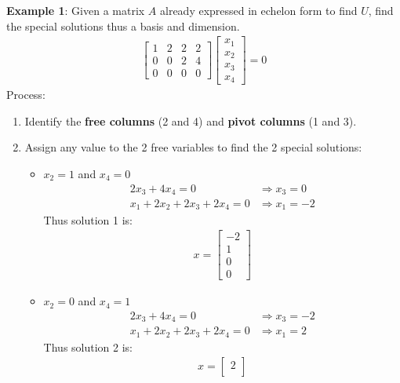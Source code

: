\documentclass[10pt,a4paper]{article}
\begin{document}
\textbf{Example 1}: Given a matrix $A$ already expressed in echelon form to find $U$, find the
special solutions thus a basis and dimension.
\begin{align*}
    \begin{bmatrix}
        1&2&2&2 \\ 
        0&0&2&4 \\
        0&0&0&0 
    \end{bmatrix} 
    \begin{bmatrix}
        x_1 \\
        x_2 \\
        x_3 \\
        x_4 
    \end{bmatrix} = 0
\end{align*}
Process:
\begin{enumerate}
    \item Identify the \textbf{free columns} (2 and 4) and \textbf{pivot columns} (1 and 3).
    \item Assign any value to the 2 free variables to find the 2 special solutions:
    \begin{itemize}
        \item $x_2=1$ and $x_4=0$
        \begin{align*}
            2x_3+4x_4=0 &\Rightarrow x_3=0 \\
            x_1+2x_2+2x_3+2x_4=0 &\Rightarrow x_1=-2
        \end{align*}
        Thus solution 1 is:
        \begin{align*}
            x = 
            \begin{bmatrix}
                -2 \\
                1 \\
                0 \\
                0
            \end{bmatrix}    
        \end{align*}
        \item $x_2=0$ and $x_4=1$
        \begin{align*}
            2x_3+4x_4 = 0 &\Rightarrow x_3 = -2 \\
            x_1+2x_2+2x_3+2x_4=0 &\Rightarrow x_1=2
        \end{align*}
        Thus solution 2 is:
        \begin{align*}
            x = 
            \begin{bmatrix}
                2 \\

\end{bmatrix}
\end{align*}
\end{itemize}
\end{enumerate}
\end{document}
